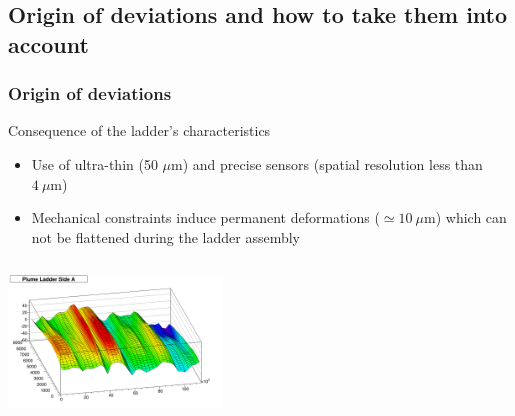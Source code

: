 \documentclass{beamer}
\begin{document}
\begin{frame}
  \vspace{-0.35cm}


\end{frame}

\subsection{Origin of deviations and how to take them into account}
\begin{frame}
  \frametitle{Origin of deviations}

  \vspace{-0.2cm}
  \begin{block}{Consequence of the ladder's characteristics}
    \begin{itemize}
      \item Use of ultra-thin (50 $\mu\text{m}$) and precise sensors (spatial resolution less than $4~\mu\text{m}$)
      \item Mechanical constraints induce permanent deformations ($\simeq 10~\mu\text{m}$) which can not be flattened during the ladder assembly
    \end{itemize}
  \end{block}

  \vspace{-0.2cm}

  \vspace{-0.3cm}
  \begin{columns}[c]
    \begin{column}{6cm}
      \begin{center}
        \includegraphics[width = 5.7cm]{Pictures/SideAPlumeLadder2010_M20.png}
      \end{center}
    \end{column}


\end{columns}
\end{frame}
\end{document}
